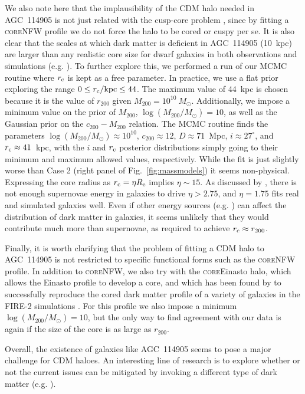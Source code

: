 \documentclass[fleqn,usenatbib]{mnras}
\begin{document}
We also note here that the implausibility of the CDM halo needed in AGC~114905 is not just related with the cusp-core problem \citep{bullock2017}, since by fitting a \textsc{core}NFW profile we do not force the halo to be cored or cuspy per se. It is also clear that the scales at which dark matter is deficient in AGC~114905 (10~kpc) are larger than any realistic core size for dwarf galaxies in both observations and simulations (e.g. \citealt{coreNFW,read2017,coreEinasto}). To further explore this, we performed a run of our MCMC routine where $r_{\rm c}$ is kept as a free parameter. In practice, we use a flat prior exploring the range $0 \leq r_{\rm c}/\textrm{kpc} \leq 44$. The maximum value of 44~kpc is chosen because it is the value of $r_{200}$ given $M_{200} = 10^{10}~M_\odot$. Additionally, we impose a minimum value on the prior of $M_{200}$, $\log(M_{200}/M_\odot)=10$, as well as the Gaussian prior on the $c_{200}-M_{200}$ relation. The MCMC routine finds the parameters $\log(M_{200}/M_\odot) \approx 10^{10}$, $c_{200} \approx 12$, $D \approx 71$~Mpc, $i \approx 27^\circ$, and $r_{\rm c} \approx 41$~kpc, with the $i$ and $r_{\rm c}$ posterior distributions simply going to their minimum and maximum allowed values, respectively. While the fit is just slightly worse than Case 2 (right panel of Fig.~\ref{fig:massmodels}) it seems non-physical. Expressing the core radius as $r_{\rm c} = \eta R_{\rm e}$ implies $\eta \sim 15$. As discussed by \citet{read2017}, there is not enough supernovae energy in galaxies to drive  $\eta > 2.75$, and $\eta = 1.75$ fits real and simulated galaxies well. Even if other energy sources (e.g. \citealt{bookFilippo}) can affect the distribution of dark matter in galaxies, it seems unlikely that they would contribute much more than supernovae, as required to achieve $r_{\rm c} \approx r_{200}$. 


Finally, it is worth clarifying that the problem of fitting a CDM halo to AGC~114905 is not restricted to specific functional forms such as the \textsc{core}NFW profile. In addition to \textsc{core}NFW, we also try with the \textsc{core}Einasto halo, which allows the Einasto profile to develop a core, and which has been found by \citet{coreEinasto} to successfully reproduce the cored dark matter profile of a variety of galaxies in the FIRE-2 simulations \citep{fire2}. For this profile we also impose a minimum $\log(M_{200}/M_\odot)=10$, but the only way to find agreement with our data is again if the size of the core is as large as $r_{200}$. 

Overall, the existence of galaxies like AGC~114905 seems to pose a major challenge for CDM haloes. An interesting line of research is to explore whether or not the current issues can be mitigated by invoking a different type of dark matter (e.g. \citealt{kaplinghat2020,yang_sidm}).%
\end{document}
